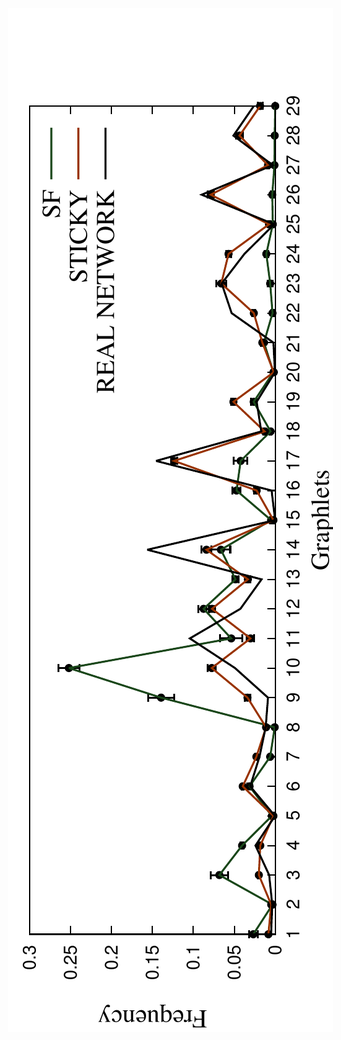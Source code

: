 \begin{figure}[H]
\begin{subfigure}[b]{1.0\textwidth}
  \end{subfigure}
  \begin{subfigure}[b]{1.0\textwidth}
    \includegraphics[angle=-90,scale=0.6]{../code/final_results/trade_2010_thresholded/avg_egdvs_rnd_spreads_figures/spreads_34_rnd2.pdf} 

\end{subfigure}
\end{figure}
